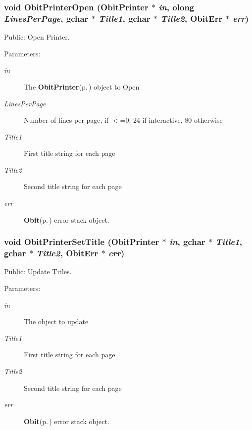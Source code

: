 \subsubsection{\setlength{\rightskip}{0pt plus 5cm}void Obit\-Printer\-Open ({\bf Obit\-Printer} $\ast$ {\em in}, {\bf olong} {\em Lines\-Per\-Page}, gchar $\ast$ {\em Title1}, gchar $\ast$ {\em Title2}, {\bf Obit\-Err} $\ast$ {\em err})}\label{ObitPrinter_8c_a11}


Public: Open Printer. 

\begin{Desc}
\item[Parameters:]
\begin{description}
\item[{\em in}]The {\bf Obit\-Printer}{\rm (p.\,\pageref{structObitPrinter})} object to Open \item[{\em Lines\-Per\-Page}]Number of lines per page, if $<$=0: 24 if interactive, 80 otherwise \item[{\em Title1}]First title string for each page \item[{\em Title2}]Second title string for each page \item[{\em err}]{\bf Obit}{\rm (p.\,\pageref{structObit})} error stack object. \end{description}
\end{Desc}
\subsubsection{\setlength{\rightskip}{0pt plus 5cm}void Obit\-Printer\-Set\-Title ({\bf Obit\-Printer} $\ast$ {\em in}, gchar $\ast$ {\em Title1}, gchar $\ast$ {\em Title2}, {\bf Obit\-Err} $\ast$ {\em err})}\label{ObitPrinter_8c_a14}


Public: Update Titles. 

\begin{Desc}
\item[Parameters:]
\begin{description}
\item[{\em in}]The object to update \item[{\em Title1}]First title string for each page \item[{\em Title2}]Second title string for each page \item[{\em err}]{\bf Obit}{\rm (p.\,\pageref{structObit})} error stack object. \end{description}
\end{Desc}
